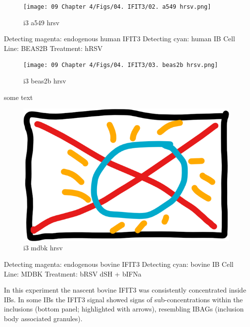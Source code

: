 \begin{figure}
    \centering
    \texttt{[image: 09 Chapter 4/Figs/04. IFIT3/02. a549 hrsv.png]}
    \caption[i3 a549 hrsv]{i3 a549 hrsv}
    \label{fig:i3 a549 hrsv}
\end{figure}

Detecting magenta: endogenous human IFIT3 \newline
Detecting cyan: human IB \newline
Cell Line: BEAS2B \newline
Treatment: hRSV \newline

\begin{figure}
    \centering
    \texttt{[image: 09 Chapter 4/Figs/04. IFIT3/03. beas2b hrsv.png]}
    \caption[i3 beas2b hrsv]{i3 beas2b hrsv}
    \label{fig:i3 beas2b hrsv}
\end{figure}

 \label{bIFIT3 Localisation During h/bRSV Infection}
some text

\begin{figure}
    \centering
    \includegraphics[width=0.5\linewidth]{06. Chapter 1//Figs/00. placeholder.png}
    \caption[i3 mdbk hrsv]{i3 mdbk hrsv}
    \label{fig:i3 mdbk hrsv}
\end{figure}

Detecting magenta: endogenous bovine IFIT3 \newline
Detecting cyan: bovine IB \newline
Cell Line: MDBK \newline
Treatment: bRSV dSH + bIFNa \newline

In this experiment the nascent bovine IFIT3 was consistently concentrated inside IBs. In some IBs the IFIT3 signal showed signs of sub-concentrations within the inclusions (bottom panel; highlighted with arrows), resembling IBAGs (inclusion body associated granules).

